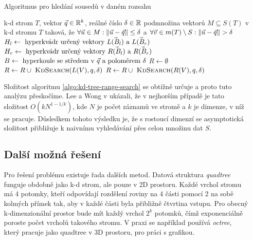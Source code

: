 \begin{algorithm}
  \caption{Algoritmus pro hledání sousedů v daném rozsahu}
  \label{algo:kd-tree-range-search}
  \begin{algorithmic}
    \Require k-d strom $T$, vektor $\vec{q} \in \mathbb{R}^k$, reálné číslo $\delta \in \mathbb{R}$
    \Ensure podmnožina vektorů $M \subseteq S(T)$ v k-d stromu $T$ taková, že $\forall \vec{u} \in M: \|\vec{u} - \vec{q}\| \leq \delta$ a $\forall \vec{v} \in m(T) \setminus S: \|\vec{u} - \vec{q}\| > \delta$
        \State \Return {}
      \EndIf
      \State $H_l \leftarrow \hbox{ hyperkvádr určený vektory } \vec{L(B_l)} \hbox{ a } \vec{L(B_r)}$
      \State $H_r \leftarrow \hbox{ hyperkvádr určený vektory } \vec{R(B_l)} \hbox{ a } \vec{R(B_r)}$
      \State $B \leftarrow \hbox{ hyperkoule se středem v } \vec{q} \hbox{ a poloměrem } \delta$
      \State $R \leftarrow \emptyset$
        \State $R \leftarrow R \cup \hbox{ \Call{KdSearch}{$L(V), q, \delta$}}$
      \EndIf
        \State $R \leftarrow R \cup \hbox{ \Call{KdSearch}{$R(V), q, \delta$}}$
      \EndIf
      \State {}
    \EndProcedure
  \end{algorithmic}
\end{algorithm}

Složitost algoritmu \ref{algo:kd-tree-range-search} se obtížně určuje a proto tuto analýzu přeskočíme. Lee a Wong v \cite{kd-tree-worst} ukázali, že v nejhorším případě je tato složitost $O(kN^{1-1/k})$, kde $N$ je počet záznamů ve stromě a $k$ je dimenze, v níž se pracuje. Důsledkem tohoto výsledku je, že s rostoucí dimenzí se asymptotická složitost přibližuje k naivnímu vyhledávání přes celou množinu dat $S$.

\subsection{Další možná řešení}

Pro řešení problému existuje řada dalších metod. Datová struktura \textit{quadtree} funguje obdobně jako k-d strom, ale pouze v 2D prostoru. Každé vrchol stromu má 4 potomky, kteří odpovídají rozdělení roviny na 4 části pomocí 2 na sobě kolmých přímek tak, aby v každé části byla přibližně čtvrtina vstupu. Pro obecný k-dimenzionální prostor bude mít každý vrchol $2^k$ potomků, čímž exponenciálně poroste počet vrcholů takového stromu. V praxi se například používá \textit{octree}, který pracuje jako quadtree v 3D prostoru, pro práci s grafikou.\cite{octree-usage}

